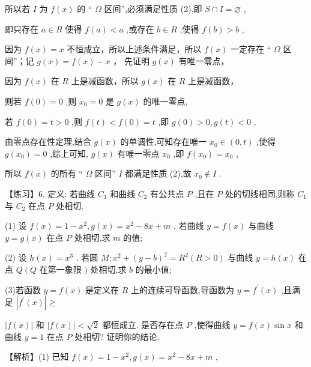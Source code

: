 \documentclass[10pt]{article}
\begin{document}
所以若 \(I\) 为 \(f\left( x\right)\) 的 “ \(\Omega\) 区间”,必须满足性质 (2),即 \(S \cap  I = \varnothing\) ,

即只存在 \(a \in  R\) 使得 \(f\left( a\right)  < a\) ,或存在 \(b \in  R\) ,使得 \(f\left( b\right)  > b\) ,

因为 \(f\left( x\right)  = x\) 不恒成立，所以上述条件满足，所以 \(f\left( x\right)\) 一定存在 “ \(\Omega\) 区间”；记 \(g\left( x\right)  = f\left( x\right)  - x\) ， 先证明 \(g\left( x\right)\) 有唯一零点，

因为 \(f\left( x\right)\) 在 \(R\) 上是减函数，所以 \(g\left( x\right)\) 在 \(R\) 上是减函数，

则若 \(f\left( 0\right)  = 0\) ,则 \({x}_{0} = 0\) 是 \(g\left( x\right)\) 的唯一零点,

若 \(f\left( 0\right)  = t > 0\) ,则 \(f\left( t\right)  < f\left( 0\right)  = t\) ,即 \(g\left( 0\right)  > 0,g\left( t\right)  < 0\) ,

由零点存在性定理,结合 \(g\left( x\right)\) 的单调性,可知存在唯一 \({x}_{0} \in  \left( {0,t}\right)\) ,使得 \(g\left( {x}_{0}\right)  = 0\) ,综上可知, \(g\left( x\right)\) 有唯一零点 \({x}_{0}\) ,即 \(f\left( {x}_{0}\right)  = {x}_{0}\) ,

所以 \(f\left( x\right)\) 的所有 “ \(\Omega\) 区间” \(I\) 都满足性质 (2),故 \({x}_{0} \notin  I\) .

【练习】6. 定义: 若曲线 \({C}_{1}\) 和曲线 \({C}_{2}\) 有公共点 \(P\) ,且在 \(P\) 处的切线相同,则称 \({C}_{1}\) 与 \({C}_{2}\) 在点 \(P\) 处相切.

(1) 设 \(f\left( x\right)  = 1 - {x}^{2},g\left( x\right)  = {x}^{2} - {8x} + m\) . 若曲线 \(y = f\left( x\right)\) 与曲线 \(y = g\left( x\right)\) 在点 \(P\) 处相切,求 \(m\) 的值;

(2) 设 \(h\left( x\right)  = {x}^{3}\) . 若圆 \(M : {x}^{2} + {\left( y - b\right) }^{2} = {R}^{2}\left( {R > 0}\right)\) 与曲线 \(y = h\left( x\right)\) 在点 \(Q\left( Q\right.\) 在第一象限 \()\) 处相切,求 \(b\) 的最小值;

(3)若函数 \(y = f\left( x\right)\) 是定义在 \(R\) 上的连续可导函数,导函数为 \(y = {f}^{\prime }\left( x\right)\) ,且满足 \(\left| {{f}^{\prime }\left( x\right) }\right|  \geq\)

\(\left| {f\left( x\right) }\right|\) 和 \(\left| {f\left( x\right) }\right|  < \sqrt{2}\) 都恒成立. 是否存在点 \(P\) ,使得曲线 \(y = f\left( x\right) \sin x\) 和曲线 \(y = 1\) 在点 \(P\) 处相切? 证明你的结论.

【解析】(1) 已知 \(f\left( x\right)  = 1 - {x}^{2},g\left( x\right)  = {x}^{2} - {8x} + m\) ,
\end{document}
